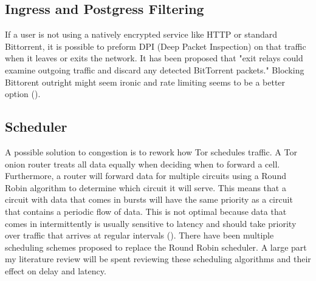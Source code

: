 \documentclass[letterpaper,13pt]{texMemo}
\begin{document}
    \subsection*{Ingress and Postgress Filtering}
    If a user is not using a natively encrypted service like HTTP or standard Bittorrent, it is
    possible to preform DPI (Deep Packet Inspection) on that traffic when it leaves or exits the
    network. It has been proposed that "exit relays could examine outgoing traffic and discard any
    detected BitTorrent packets." Blocking Bittorent outright might seem ironic and rate limiting
    seems to be a better option (\citeauthor[2]{Moore}).

    \subsection*{Scheduler}
    A possible solution to congestion is to rework how Tor schedules traffic. A Tor onion router
    treats all data equally when deciding when to forward a cell. Furthermore, a router will
    forward data for multiple circuits using a Round Robin algorithm to determine which circuit it
    will serve. This means that a circuit with data that comes in bursts will have the same priority
    as a circuit that contains a periodic flow of data. This is not optimal because data that comes
    in intermittently is usually sensitive to latency and should take priority over traffic that
    arrives at regular intervals (\citeauthor[2]{unfair}). There have been multiple scheduling
    schemes proposed to replace the Round Robin scheduler. A large part my literature review will be
    spent reviewing these scheduling algorithms and their effect on delay and latency.
\end{document}

